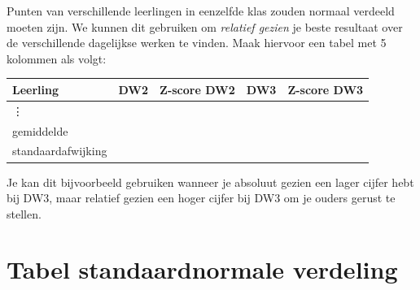 \documentclass[12pt,twoside,a4paper]{article}
\begin{document}
\begin{oefening}
Punten van verschillende leerlingen in eenzelfde klas zouden normaal verdeeld moeten zijn. We kunnen dit gebruiken om {\em relatief gezien} je beste resultaat over de verschillende dagelijkse werken te vinden. Maak hiervoor een tabel met 5 kolommen als volgt:
\begin{center}
  \begin{tabular}{l|c|c|c|c}
  Leerling           & DW2 & Z-score DW2 & DW3 & Z-score DW3 \\
  \hline
  \vdots                  &     &             &     &             \\
  \hline
  gemiddelde         &     &             &     &             \\
  standaardafwijking &     &             &     &             \\
  \end{tabular}
\end{center}
Je kan dit bijvoorbeeld gebruiken wanneer je absoluut gezien een lager cijfer hebt bij DW3, maar relatief gezien een hoger cijfer bij DW3 om je ouders gerust te stellen.
\end{oefening}

\appendix
\cleardoublepage
\section*{Tabel standaardnormale verdeling}
\end{document}

